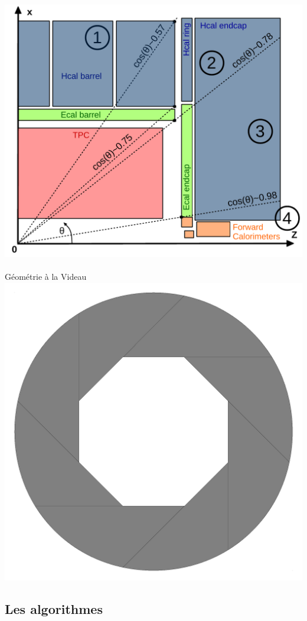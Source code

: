 \documentclass[8pt]{beamer}
\begin{document}
\begin{frame}
\begin{minipage}{0.43\linewidth}
\begin{center}
        \includegraphics[width=0.8\linewidth]{BarrelEndcapRegions.pdf} \\
        ~ \\
        Géométrie à la Videau
        \includegraphics[width=0.8\linewidth]{VIDEAU-structure.pdf}
      \end{center}
    \end{minipage}
  \end{frame}

  \subsection{Les algorithmes}
\end{document}
